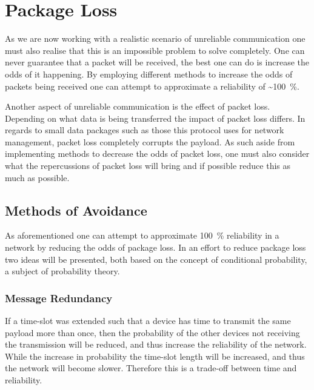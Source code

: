 \section{Package Loss}
As we are now working with a realistic scenario of unreliable communication one must also realise that this is an impossible problem to solve completely.
One can never guarantee that a packet will be received, the best one can do is increase the odds of it happening.
By employing different methods to increase the odds of packets being received one can attempt to approximate a reliability of \textasciitilde100~\%.

Another aspect of unreliable communication is the effect of packet loss.
Depending on what data is being transferred the impact of packet loss differs.
In regards to small data packages such as those this protocol uses for network management, packet loss completely corrupts the payload.
As such aside from implementing methods to decrease the odds of packet loss, one must also consider what the repercussions of packet loss will bring and if possible reduce this as much as possible. 

\subsection{Methods of Avoidance}\label{sub:avoidance}
As aforementioned one can attempt to approximate 100~\% reliability in a network by reducing the odds of package loss.
In an effort to reduce package loss two ideas will be presented, both based on the concept of conditional probability, a subject of probability theory.

\subsubsection*{Message Redundancy}\label{redundancy}
If a time-slot was extended such that a device has time to transmit the same payload more than once, then the probability of the other devices not receiving the transmission will be reduced, and thus increase the reliability of the network.
While the increase in probability the time-slot length will be increased, and thus the network will become slower.
Therefore this is a trade-off between time and reliability. 

